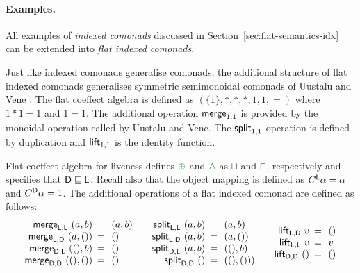 \paragraph{Examples.}
All examples of \emph{indexed comonads} discussed in Section~\ref{sec:flat-semantics-idx} can
be extended into \emph{flat indexed comonads}. 

\begin{example}
Just like indexed comonads generalise co\-monads, the additional structure of
flat indexed comonads generalises symmetric semimonoidal comonads of Uustalu 
and Vene \cite{comonads-notions}. The flat coeffect algebra is defined as $(\{1\}, \ast, \ast, \ast, 1, 1, =)$
where $1\ast1=1$ and $1=1$. The additional operation $\textnormal{\sffamily merge}_{1,1}$ is provided by the 
monoidal operation called  by Uustalu and Vene. The $\textnormal{\sffamily split}_{1,1}$ operation 
is defined by duplication and $\textnormal{\sffamily lift}_{1,1}$ is the identity function.
\end{example}

\begin{example}
Flat coeffect algebra for liveness defines $\cpar$ and $\czip$ as $\sqcup$ and $\sqcap$, respectively 
and specifies that $\textnormal{\sffamily D} \sqsubseteq \textnormal{\sffamily L}$. Recall also that the object mapping is defined 
as $C^{\textnormal{\sffamily L}}\alpha = \alpha$ and $C^{\textnormal{\sffamily D}}\alpha = 1$. The additional operations 
of a flat indexed comonad are defined as follows:
%
\begin{equation*}
\begin{array}{rcl}
\ident{merge}_{\ident{L}, \ident{L}}~(a, b) &\narrow{=}& (a, b)\\
\ident{merge}_{\ident{L}, \ident{D}}~(a, ()) &\narrow{=}& ()\\
\ident{merge}_{\ident{D}, \ident{L}}~((), b) &\narrow{=}& ()\\
\ident{merge}_{\ident{D}, \ident{D}}~((), ()) &\narrow{=}& ()\\
\end{array}
\quad
\begin{array}{rcl}
\ident{split}_{\ident{L}, \ident{L}}~(a, b) &\narrow{=}& (a, b)\\
\ident{split}_{\ident{L}, \ident{D}}~(a, b) &\narrow{=}& (a, ())\\
\ident{split}_{\ident{D}, \ident{L}}~(a, b) &\narrow{=}& ((), b)\\
\ident{split}_{\ident{D}, \ident{D}}~() &\narrow{=}& ((), ()))\\
\end{array}
\quad
\begin{array}{rcl}
\ident{lift}_{\ident{L}, \ident{D}}~v &\narrow{=}& ()\\
\ident{lift}_{\ident{L}, \ident{L}}~v &\narrow{=}& v\\
\ident{lift}_{\ident{D}, \ident{D}}~() &\narrow{=}& ()\\
\end{array}
\end{equation*}
\end{example}

